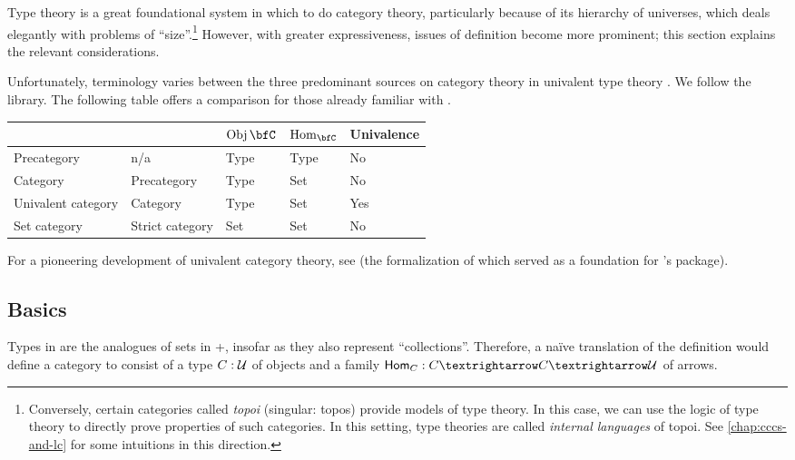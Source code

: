 \documentclass[./thesis.tex]{subfiles}
\begin{document}
Type theory is a great foundational system in which to do category theory,
particularly because of its hierarchy of universes, which deals elegantly with
problems of ``size''.\footnote{
  Conversely, certain categories called \textit{topoi} (singular: topos) provide
  models of type theory. In this case, we can use the logic of type theory to
  directly prove properties of such categories. In this setting, type theories
  are called \textit{internal languages} of topoi. See \cref{chap:cccs-and-lc}
  for some intuitions in this direction.} However, with greater expressiveness,
issues of definition become more prominent; this section explains the relevant
considerations.

Unfortunately, terminology varies between the three predominant sources on
category theory in univalent type theory \cite{book} \cite{unimath}
\cite{hott-lib}. We follow the \UniMath{} library. The
following table offers a comparison for those already familiar with \cite{book}.
\begin{center}
  \begin{tabular}{| l | l | l | l | l |}
    \hline
    \UniMath{} & \cite{book} & $\Obj\bfC$ & $\Hom_{\bfC}$ & Univalence \\ \hline
    Precategory                  & n/a             & Type & Type  & No \\
    Category                     & Precategory     & Type & Set   & No \\
    Univalent category           & Category        & Type & Set   & Yes \\
    Set category                 & Strict category & Set  & Set   & No \\
    \hline
  \end{tabular}
\end{center}
For a pioneering development of univalent category theory, see \cite{rezk} (the
formalization of which served as a foundation for \UniMath{}'s
 package). 

\subsection{Basics}
\label{subsec:basics}

Types in \UTT{} are the analogues of sets in \ZFC{}+\FOL{}, insofar as they also
represent ``collections''. Therefore, a naïve translation of the definition
would define a category to consist of a type $C:\mathcal{U}$ of objects and a
family $\ttHom_{C}:C→C→\universe$ of arrows.
\end{document}

